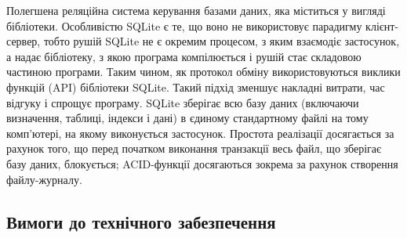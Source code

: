 \begin{itemize}
    Полегшена реляційна система керування базами даних, яка міститься у вигляді бібліотеки. Особливістю SQLite є те, що воно не використовує парадигму клієнт-сервер, тобто рушій SQLite не є окремим процесом, з яким взаємодіє застосунок, а надає бібліотеку, з якою програма компілюється і рушій стає складовою частиною програми. Таким чином, як протокол обміну використовуються виклики функцій (API) бібліотеки SQLite. Такий підхід зменшує накладні витрати, час відгуку і спрощує програму. SQLite зберігає всю базу даних (включаючи визначення, таблиці, індекси і дані) в єдиному стандартному файлі на тому комп'ютері, на якому виконується застосунок. Простота реалізації досягається за рахунок того, що перед початком виконання транзакції весь файл, що зберігає базу даних, блокується; ACID-функції досягаються зокрема за рахунок створення файлу-журналу.

\end{itemize}

\begin{comment}
\subsubsection{Засоби оформлення записки до проекту}
\begin{itemize}\itemsep1em
  \item Мова верстки -- TeX/LaTeX:

    Мова розмітки даних та пакет макросів TeX для високоякісного оформлення документів. Вважається стандартом де-факто для підготовки математичних і технічних текстів для публікації в наукових виданнях.
    На відміну від текстових процесорів, особливу увагу в LaTeX приділено відокремленню змісту статті від оформлення. LaTeX пропонує засоби для підготовки структурованих документів — документів, автор яких має можливість основну свою увагу зосередити на змісті, а оформлення і решту рутинної роботи перекласти на програму. Як і у випадку TeX — вхідні файли LaTeX можна порівняти із програмами.

  \item Движок рендерінгу документу -- XeTeX:

    Движок рендерінгу TeX з використанням Юнікоду та підтримкою сучасних шрифтових технологій, таких як OpenType, Graphite, та Apple Advanced Typography (AAT).
\end{itemize}
\end{comment}

\subsection{Вимоги до технічного забезпечення}

